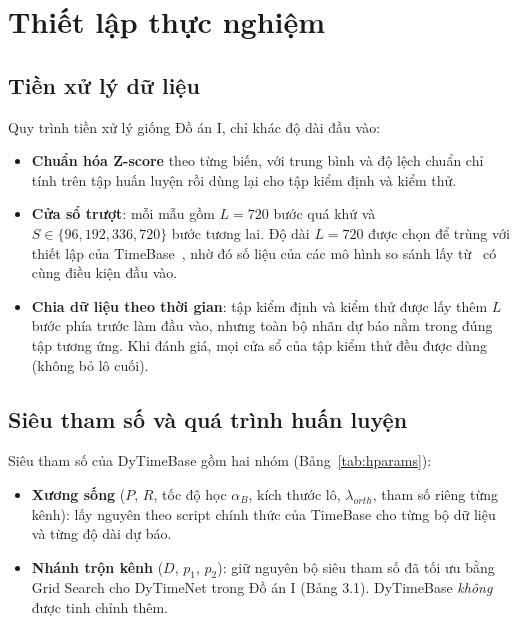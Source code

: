 \documentclass[12pt,a4paper]{report}
\numberwithin{equation}{chapter}
\begin{document}
\section{Thiết lập thực nghiệm}

\subsection{Tiền xử lý dữ liệu}

Quy trình tiền xử lý giống Đồ án I, chỉ khác độ dài đầu vào:
\begin{itemize}
  \item \textbf{Chuẩn hóa Z-score} theo từng biến, với trung bình và độ lệch chuẩn chỉ tính trên tập huấn luyện rồi dùng
        lại cho tập kiểm định và kiểm thử.
  \item \textbf{Cửa sổ trượt}: mỗi mẫu gồm $L=720$ bước quá khứ và $S\in\{96,192,336,720\}$ bước tương lai. Độ dài
        $L=720$ được chọn để trùng với thiết lập của TimeBase~\cite{timebase}, nhờ đó số liệu của các mô hình so sánh
        lấy từ~\cite{timebase} có cùng điều kiện đầu vào.
  \item \textbf{Chia dữ liệu theo thời gian}: tập kiểm định và kiểm thử được lấy thêm $L$ bước phía trước làm đầu vào,
        nhưng toàn bộ nhãn dự báo nằm trong đúng tập tương ứng. Khi đánh giá, mọi cửa sổ của tập kiểm thử đều được dùng
        (không bỏ lô cuối).
\end{itemize}

\subsection{Siêu tham số và quá trình huấn luyện}

Siêu tham số của DyTimeBase gồm hai nhóm (Bảng~\ref{tab:hparams}):
\begin{itemize}
  \item \textbf{Xương sống} ($P$, $R$, tốc độ học $\alpha_B$, kích thước lô, $\lambda_{orth}$, tham số riêng từng kênh):
        lấy nguyên theo script chính thức của TimeBase cho từng bộ dữ liệu và từng độ dài dự báo.
  \item \textbf{Nhánh trộn kênh} ($D$, $p_1$, $p_2$): giữ nguyên bộ siêu tham số đã tối ưu bằng Grid Search cho DyTimeNet
        trong Đồ án I (Bảng 3.1). DyTimeBase \emph{không} được tinh chỉnh thêm.
\end{itemize}


\end{document}
